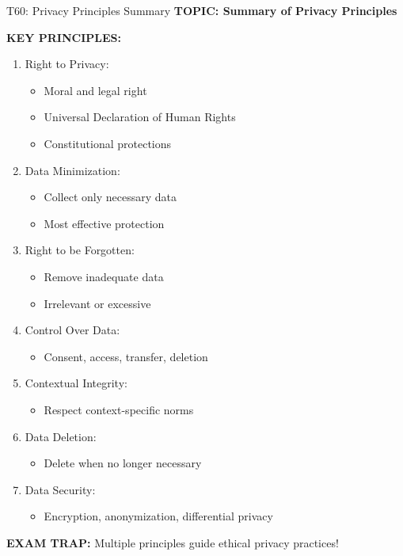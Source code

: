 \documentclass[8pt]{beamer}
\begin{document}
	\begin{frame}{T60: Privacy Principles Summary}
		\fontsize{6.5}{7.5}\selectfont
		\textbf{TOPIC: Summary of Privacy Principles}
		
		\vspace{0.1cm}
		\textbf{KEY PRINCIPLES:}
		\begin{enumerate}
			\item \textcolor{myblue}{Right to Privacy:}
			\begin{itemize}
				\item Moral and legal right
				\item Universal Declaration of Human Rights
				\item Constitutional protections
			\end{itemize}
			\item \textcolor{myblue}{Data Minimization:}
			\begin{itemize}
				\item Collect only necessary data
				\item Most effective protection
			\end{itemize}
			\item \textcolor{myblue}{Right to be Forgotten:}
			\begin{itemize}
				\item Remove inadequate data
				\item Irrelevant or excessive
			\end{itemize}
			\item \textcolor{myblue}{Control Over Data:}
			\begin{itemize}
				\item Consent, access, transfer, deletion
			\end{itemize}
			\item \textcolor{myblue}{Contextual Integrity:}
			\begin{itemize}
				\item Respect context-specific norms
			\end{itemize}
			\item \textcolor{myblue}{Data Deletion:}
			\begin{itemize}
				\item Delete when no longer necessary
			\end{itemize}
			\item \textcolor{myblue}{Data Security:}
			\begin{itemize}
				\item Encryption, anonymization, differential privacy
			\end{itemize}
		\end{enumerate}
		
		\textcolor{myred}{\textbf{EXAM TRAP:}} Multiple principles guide \textcolor{myblue}{ethical privacy practices}!
	\end{frame}
	
\end{document}
